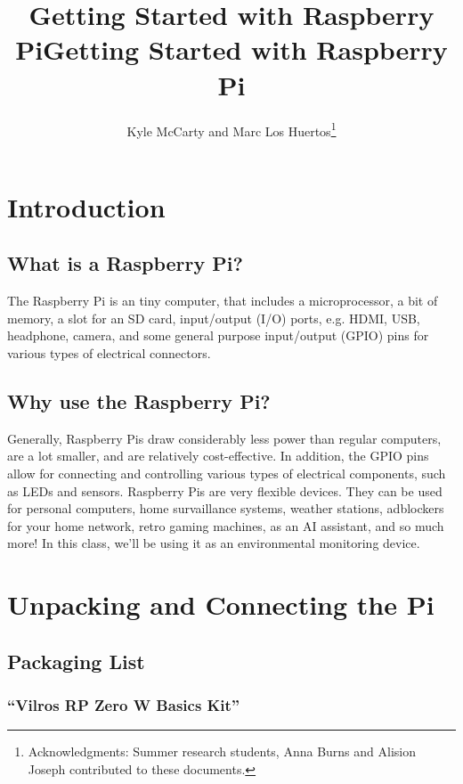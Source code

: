 \documentclass{article}
\title{Getting Started with Raspberry Pi}
\author{Kyle McCarty and Marc Los Huertos\footnote{Acknowledgments: Summer research students, Anna Burns and Alision Joseph contributed to these documents.}}
\title{Getting Started with Raspberry Pi}
\begin{document}
\maketitle

\newpage

\tableofcontents

\newpage

\section{Introduction}

\subsection{What is a Raspberry Pi?}

The Raspberry Pi is an tiny computer, that includes a microprocessor, a bit of memory, a slot for an SD card, input/output (I/O) ports, e.g. HDMI, USB, headphone, camera, and some general purpose input/output (GPIO) pins for various types of electrical connectors.

\subsection{Why use the Raspberry Pi?}

Generally, Raspberry Pis draw considerably less power than regular computers, are a lot smaller, and are relatively cost-effective. In addition, the GPIO pins allow for connecting and controlling various types of electrical components, such as LEDs and sensors. Raspberry Pis are very flexible devices. They can be used for personal computers, home survaillance systems, weather stations, adblockers for your home network, retro gaming machines, as an AI assistant, and so much more! In this class, we'll be using it as an environmental monitoring device.

\section{Unpacking and Connecting the Pi}

\subsection{Packaging List}

\subsubsection{``Vilros RP Zero W Basics Kit''}
\end{document}
